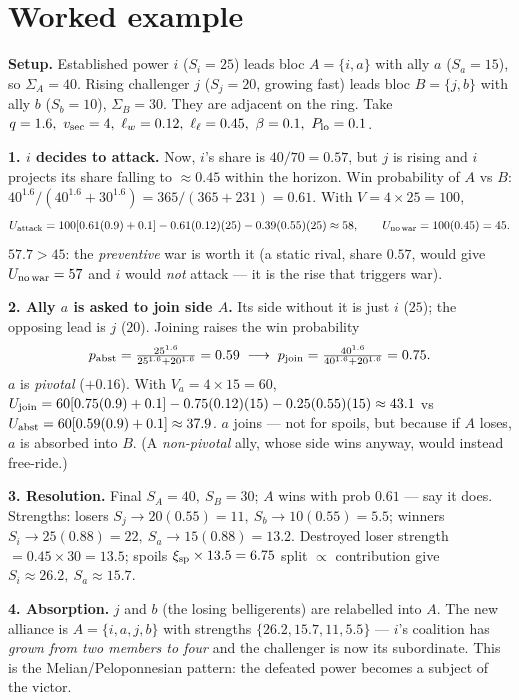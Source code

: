 \documentclass[11pt]{article}
\begin{document}
\section{Worked example}\label{sec:example}

\begin{mdframed}
\textbf{Setup.} Established power $i$ ($S_i=25$) leads bloc $A=\{i,a\}$ with ally
$a$ ($S_a=15$), so $\Sigma_A=40$. Rising challenger $j$ ($S_j=20$, growing fast)
leads bloc $B=\{j,b\}$ with ally $b$ ($S_b=10$), $\Sigma_B=30$. They are adjacent
on the ring. Take $q=1.6,\ v_{\rm sec}=4,\ \ell_w=0.12,\ \ell_\ell=0.45,\
\beta=0.1,\ P_{\rm lo}=0.1$.

\medskip
\textbf{1. $i$ decides to attack.} Now, $i$'s share is $40/70=0.57$, but $j$ is
rising and $i$ projects its share falling to $\approx0.45$ within the horizon.
Win probability of $A$ vs $B$: $40^{1.6}/(40^{1.6}+30^{1.6})=365/(365+231)=0.61$.
With $V=4\times25=100$,
\[
U_{\rm attack}=100[0.61(0.9)+0.1]-0.61(0.12)(25)-0.39(0.55)(25)\approx 58,
\qquad U_{\rm no\,war}=100(0.45)=45 .
\]
$57.7>45$: the \emph{preventive} war is worth it (a static rival, share $0.57$,
would give $U_{\rm no\,war}=57$ and $i$ would \emph{not} attack --- it is the
rise that triggers war).

\medskip
\textbf{2. Ally $a$ is asked to join side $A$.} Its side without it is just $i$
($25$); the opposing lead is $j$ ($20$). Joining raises the win probability
\[
p_{\rm abst}=\tfrac{25^{1.6}}{25^{1.6}+20^{1.6}}=0.59
\;\longrightarrow\;
p_{\rm join}=\tfrac{40^{1.6}}{40^{1.6}+20^{1.6}}=0.75 .
\]
$a$ is \emph{pivotal} ($+0.16$). With $V_a=4\times15=60$,
$U_{\rm join}=60[0.75(0.9)+0.1]-0.75(0.12)(15)-0.25(0.55)(15)\approx43.1$ vs
$U_{\rm abst}=60[0.59(0.9)+0.1]\approx37.9$. $a$ joins --- not for spoils, but
because if $A$ loses, $a$ is absorbed into $B$. (A \emph{non-pivotal} ally, whose
side wins anyway, would instead free-ride.)

\medskip
\textbf{3. Resolution.} Final $S_A=40,\ S_B=30$; $A$ wins with prob $0.61$ ---
say it does. Strengths: losers $S_j\!\to\!20(0.55)=11,\ S_b\!\to\!10(0.55)=5.5$;
winners $S_i\!\to\!25(0.88)=22,\ S_a\!\to\!15(0.88)=13.2$. Destroyed loser
strength $=0.45\times30=13.5$; spoils $\xi_{\rm sp}\times13.5=6.75$ split
$\propto$ contribution give $S_i\!\approx\!26.2,\ S_a\!\approx\!15.7$.

\medskip
\textbf{4. Absorption.} $j$ and $b$ (the losing belligerents) are relabelled into
$A$. The new alliance is $A=\{i,a,j,b\}$ with strengths
$\{26.2,15.7,11,5.5\}$ --- $i$'s coalition has \emph{grown from two members to
four} and the challenger is now its subordinate. This is the Melian/Peloponnesian
pattern: the defeated power becomes a subject of the victor.
\end{mdframed}
\end{document}
